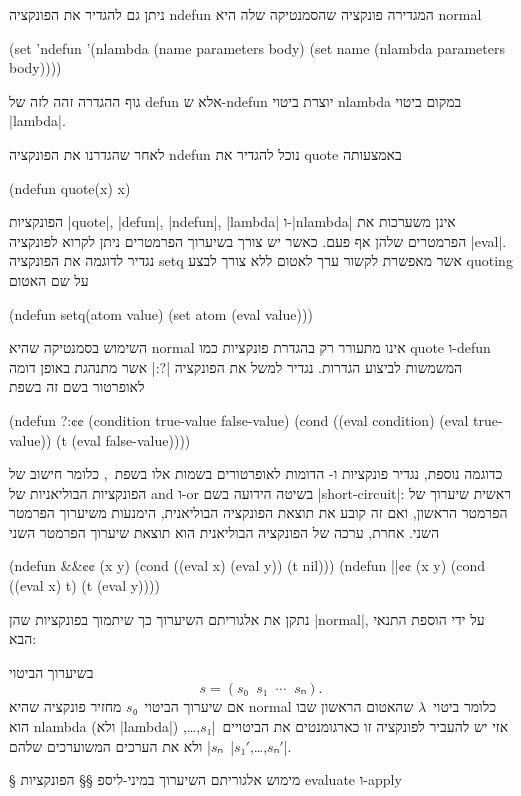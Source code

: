 ניתן גם להגדיר את הפונקציה ndefun המגדירה פונקציה שהסמנטיקה שלה היא normal
\begin{LIBRARY}
(set 'ndefun
  '(nlambda (name parameters body)
    (set name (nlambda parameters body))))
\end{LIBRARY}
גוף ההגדרה זהה לזה של defun אלא ש-ndefun יוצרת ביטוי nlambda במקום ביטוי
\E|lambda|.

לאחר שהגדרנו את הפונקציה ndefun נוכל להגדיר את quote באמצעותה
\begin{LISP}
(ndefun quote(x) x)
\end{LISP}
הפונקציות \E|quote|, \E|defun|, \E|ndefun|, \E|lambda| ו-\E|nlambda| אינן
משערכות את הפרמטרים שלהן אף פעם. כאשר יש צורך בשיערוך הפרמטרים ניתן לקרוא
לפונקציה \E|eval|. נגדיר לדוגמה את הפונקציה setq אשר מאפשרת לקשור ערך לאטום ללא
צורך לבצע quoting על שם האטום
\begin{LISP}
(ndefun setq(atom value)
  (set atom (eval value)))
\end{LISP}
השימוש בסמנטיקה שהיא normal אינו מתעורר רק בהגדרת פונקציות כמו quote ו-defun
המשמשות לביצוע הגדרות. נגדיר למשל את הפונקציה \T|?:| אשר מתנהגת באופן דומה
לאופרטור בשם זה בשפת~\CPL
\begin{LISP}
(ndefun ?:¢¢ (condition true-value false-value)
  (cond ((eval condition) (eval true-value))
        (t (eval false-value))))
\end{LISP}
כדוגמה נוספת, נגדיר פונקציות \lisp{||} ו-\lisp{&&} הדומות לאופרטורים בשמות אלו
בשפת~\CPL, כלומר חישוב של הפונקציות הבוליאניות של and ו-or בשיטה הידועה בשם
\E|short-circuit|: ראשית שיערוך של הפרמטר הראשון, ואם זה קובע את תוצאת הפונקציה
הבוליאנית, הימנעות משיערוך הפרמטר השני. אחרת, ערכה של הפונקציה הבוליאנית הוא תוצאת
שיערוך הפרמטר השני
\begin{LISP}
(ndefun &&¢¢ (x y)
  (cond ((eval x) (eval y))
        (t nil)))
(ndefun ||¢¢ (x y)
  (cond ((eval x) t)
        (t (eval y))))
\end{LISP}

נתקן את אלגוריתם השיערוך כך שיתמוך בפונקציות שהן \E|normal|, על ידי הוספת התנאי
הבא:
\begin{mdframed}[backgroundcolor=Lavender!20]
  \footnotesize
  בשיערוך הביטוי \[
    s=(s₀\;\;s₁\;\;⋯\;\;sₙ).
\] אם שיערוך הביטוי~$s₀$ מחזיר פונקציה שהיא
  normal כלומר ביטוי~$λ$ שהאטום הראשון שבו הוא nlambda (ולא \E|lambda|) אזי יש
  להעביר לפונקציה זו כארגומנטים את הביטויים~\E|$s₁$,…,$sₙ$| ולא את הערכים
  המשוערכים שלהם~\E|$s₁'$,…,$sₙ'$|.
\end{mdframed}

§ מימוש אלגוריתם השיערוך במיני-ליספ
§§ הפונקציות evaluate ו-apply

